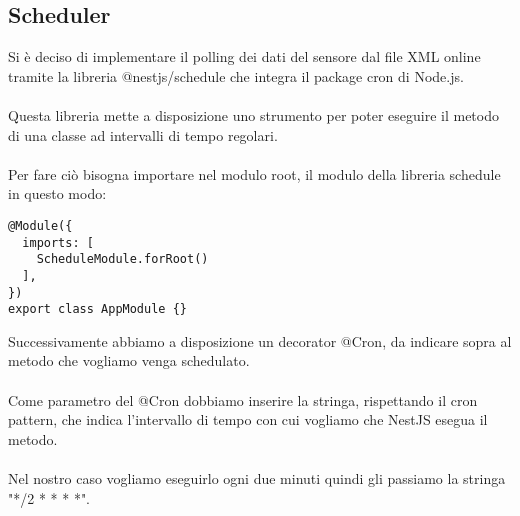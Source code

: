 \subsection{Scheduler}
Si è deciso di implementare il polling dei dati del sensore dal file XML online
tramite la libreria @nestjs/schedule che integra il package cron di Node.js.
\\\\
Questa libreria mette a disposizione uno strumento per poter eseguire il metodo
di una classe ad intervalli di tempo regolari.
\\\\
Per fare ciò bisogna importare nel modulo root, il modulo della libreria schedule in questo modo:
\begin{lstlisting}
@Module({
  imports: [
    ScheduleModule.forRoot()
  ],
})
export class AppModule {}
\end{lstlisting}
\leavevmode\newline
Successivamente abbiamo a disposizione un decorator @Cron, da indicare sopra al metodo che vogliamo venga 
schedulato. 
\\\\
Come parametro del @Cron dobbiamo inserire la stringa, rispettando il cron pattern, che indica
l'intervallo di tempo con cui vogliamo che NestJS esegua il metodo.
\\\\
Nel nostro caso vogliamo eseguirlo ogni due minuti quindi gli passiamo la stringa "*/2 * * * *".
\\\\